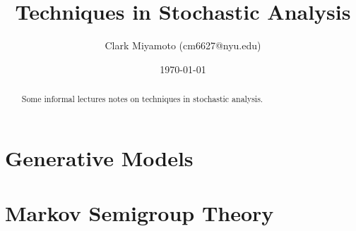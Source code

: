 \documentclass[12pt,fleqn]{article}
\title{Techniques in Stochastic Analysis}
\author{Clark Miyamoto (cm6627@nyu.edu)}
\date{\today}
\numberwithin{equation}{section}
\theoremstyle{definition}
\theoremstyle{definition}
\begin{document}
\maketitle

\begin{abstract}
	Some informal lectures notes on techniques in stochastic analysis.
\end{abstract}

\tableofcontents

\newpage

\part{Generative Models}


\newpage

\part{Markov Semigroup Theory}

\end{document}
